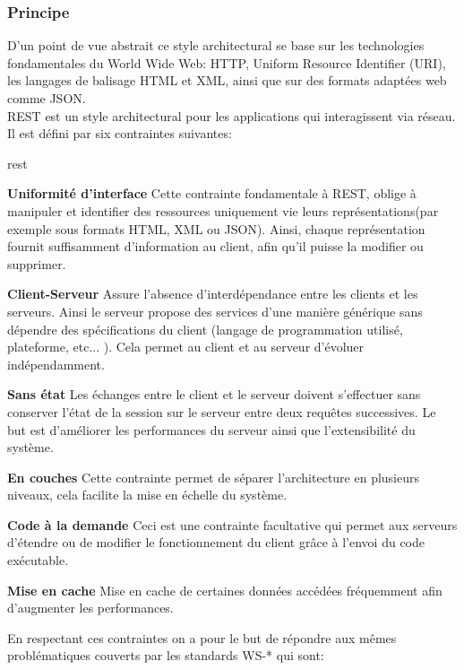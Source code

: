 \subsubsection{Principe}
D'un point de vue abstrait ce style architectural se base sur les technologies fondamentales du World Wide Web: HTTP, Uniform Resource Identifier (URI),  les langages de balisage HTML et XML, ainsi que sur des formats adaptées web comme JSON.\\
REST est un style architectural pour les applications qui interagissent via réseau. Il est défini par six contraintes suivantes: 
\begin{labeling}{rest}
	
\item [\textbf{Uniformité d'interface}] Cette contrainte fondamentale à REST, oblige à manipuler et identifier des ressources uniquement vie leurs représentations(par exemple sous formats HTML, XML ou JSON). Ainsi, chaque représentation fournit suffisamment d'information au client, afin qu'il puisse la modifier ou supprimer.

\item [\textbf{Client-Serveur}] Assure l'absence d'interdépendance entre les clients et les serveurs. Ainsi le serveur propose des services d'une manière générique sans dépendre des spécifications du client (langage de programmation utilisé, plateforme, etc... ). Cela permet au client et au serveur d'évoluer indépendamment. 


\item [\textbf{Sans état}] Les échanges entre le client et le serveur doivent s'effectuer sans conserver l'état de la session sur le serveur entre deux requêtes successives. Le but est d'améliorer les performances du serveur ainsi que l'extensibilité du système. 

\item [\textbf{En couches}] Cette contrainte permet de séparer l'architecture en plusieurs niveaux, cela facilite la mise en échelle du système. 
\item [\textbf{Code à la demande}] Ceci est une contrainte facultative qui permet aux serveurs d'étendre ou de modifier le fonctionnement du client grâce à l'envoi du code exécutable.
\item [\textbf{Mise en cache}] Mise en cache de certaines données accédées fréquemment afin d'augmenter les performances. \cite{restcook}

\end{labeling}
 En respectant ces contraintes on a pour le but de répondre aux mêmes problématiques couverts par les standards WS-* qui sont:
